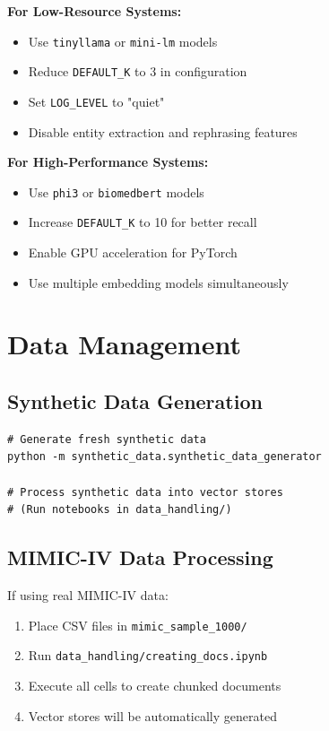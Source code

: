 \textbf{For Low-Resource Systems:}
\begin{itemize}
    \item Use \texttt{tinyllama} or \texttt{mini-lm} models
    \item Reduce \texttt{DEFAULT\_K} to 3 in configuration
    \item Set \texttt{LOG\_LEVEL} to "quiet"
    \item Disable entity extraction and rephrasing features
\end{itemize}

\textbf{For High-Performance Systems:}
\begin{itemize}
    \item Use \texttt{phi3} or \texttt{biomedbert} models
    \item Increase \texttt{DEFAULT\_K} to 10 for better recall
    \item Enable GPU acceleration for PyTorch
    \item Use multiple embedding models simultaneously
\end{itemize}

\section{Data Management}

\subsection{Synthetic Data Generation}

\begin{verbatim}
# Generate fresh synthetic data
python -m synthetic_data.synthetic_data_generator

# Process synthetic data into vector stores
# (Run notebooks in data_handling/)
\end{verbatim}

\subsection{MIMIC-IV Data Processing}

If using real MIMIC-IV data:
\begin{enumerate}
    \item Place CSV files in \texttt{mimic\_sample\_1000/}
    \item Run \texttt{data\_handling/creating\_docs.ipynb}
    \item Execute all cells to create chunked documents
    \item Vector stores will be automatically generated
\end{enumerate}

